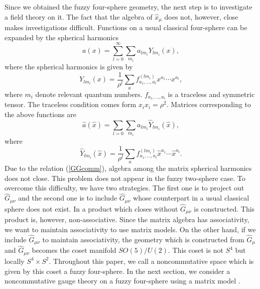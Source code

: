\documentclass[a4paper,11pt]{article}
\begin{document}
\vspace{0.5cm} 
Since we obtained the fuzzy four-sphere geometry, 
the next step is to investigate a field theory 
on it. 
The fact that the algebra of $\hat{x}_{\mu}$ 
does not, however, close makes investigations difficult.  
Functions on a usual classical four-sphere can be expanded by the 
spherical harmonics 
\begin{equation}
a(x)=\sum_{l=0}^{\infty}\sum_{m_{i}}
a_{lm_{i}}Y_{lm_{i}}(x), 
\end{equation}
where the spherical harmonics is given by 
\begin{equation}
Y_{lm_{i}}(x)=\frac{1}{\rho^{l}}
\sum_{a}f_{a_{1},\ldots,a_{l}}^{(lm_{i})}
x^{a_{1}}\cdots x^{a_{l}}, 
\end{equation}
where $m_{i}$ denote relevant quantum numbers. 
$f_{a_{1},\ldots,a_{l}}$ is a traceless and symmetric tensor. 
The traceless condition comes form $x_{i}x_{i}=\rho^{2}$. 
Matrices corresponding to the above functions are 
\begin{equation}
\hat{a}(\hat{x})=\sum_{l=0}\sum_{m_{i}}
a_{lm_{i}}\hat{Y}_{lm_{i}}(\hat{x}), 
\end{equation}
where 
\begin{equation}
\hat{Y}_{lm_{i}}(\hat{x})=\frac{1}{\rho^{l}}
\sum_{a}f_{a_{1},\ldots,a_{l}}^{(lm_{i})}
\hat{x}^{a_{1}}\cdots \hat{x}^{a_{l}}. 
\label{classicalharmonics}
\end{equation}
Due to the relation (\ref{GGcomm}), 
algebra among the matrix spherical harmonics 
does not close. 
This problem does not appear in the fuzzy two-sphere case. 
To overcome this difficulty, we have two strategies. 
The first one is to project out $\hat{G}_{\mu\nu}$\cite{ramgoo} 
and 
the second one is to include $\hat{G}_{\mu\nu}$ whose 
counterpart in a usual classical sphere does not exist. 
In \cite{ramgoo} a product which closes without $\hat{G}_{\mu\nu}$ 
is constructed. 
This product is, however, non-associative. 
Since the matrix algebra has associativity, we want 
to maintain associativity 
to use matrix models. 
On the other hand, 
if we include $\hat{G}_{\mu\nu}$ to maintain associativity, 
the geometry which is constructed 
from $\hat{G}_{\mu}$ and $\hat{G}_{\mu\nu}$ 
becomes the coset manifold $SO(5)/U(2)$\cite{horamgooram}. 
This coset is not $S^{4}$ but locally 
$S^{4} \times S^{2}$. 
Throughout this paper, we call a noncommutative space which 
is given by this coset 
a fuzzy four-sphere. 
In the next section, we consider a noncommutative gauge theory on a 
fuzzy four-sphere using a matrix model . 
\end{document}
